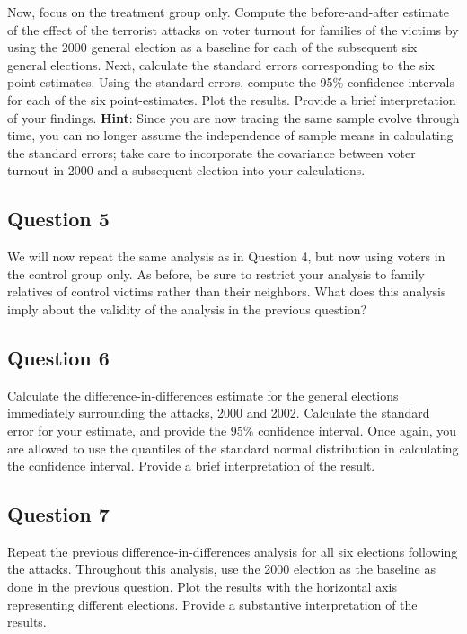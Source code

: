 \documentclass[]{article}
\begin{document}
Now, focus on the treatment group only. Compute the before-and-after
estimate of the effect of the terrorist attacks on voter turnout for
families of the victims by using the 2000 general election as a baseline
for each of the subsequent six general elections. Next, calculate the
standard errors corresponding to the six point-estimates. Using the
standard errors, compute the 95\% confidence intervals for each of the
six point-estimates. Plot the results. Provide a brief interpretation of
your findings. \textbf{Hint}: Since you are now tracing the same sample
evolve through time, you can no longer assume the independence of sample
means in calculating the standard errors; take care to incorporate the
covariance between voter turnout in 2000 and a subsequent election into
your calculations.

\subsection{Question 5}\label{question-5}

We will now repeat the same analysis as in Question 4, but now using
voters in the control group only. As before, be sure to restrict your
analysis to family relatives of control victims rather than their
neighbors. What does this analysis imply about the validity of the
analysis in the previous question?

\subsection{Question 6}\label{question-6}

Calculate the difference-in-differences estimate for the general
elections immediately surrounding the attacks, 2000 and 2002. Calculate
the standard error for your estimate, and provide the 95\% confidence
interval. Once again, you are allowed to use the quantiles of the
standard normal distribution in calculating the confidence interval.
Provide a brief interpretation of the result.

\subsection{Question 7}\label{question-7}

Repeat the previous difference-in-differences analysis for all six
elections following the attacks. Throughout this analysis, use the 2000
election as the baseline as done in the previous question. Plot the
results with the horizontal axis representing different elections.
Provide a substantive interpretation of the results.
\end{document}
